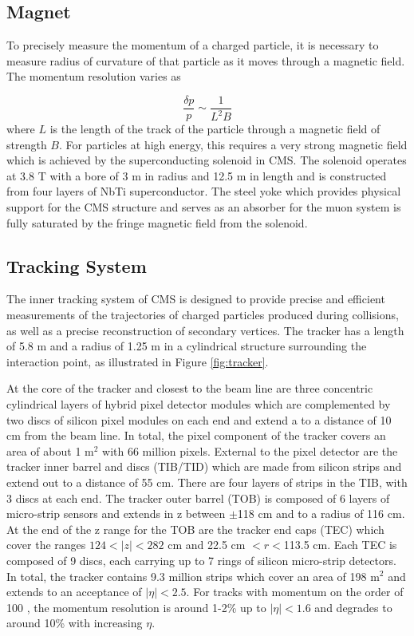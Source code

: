  \subsection{Magnet}
To precisely measure the momentum of a charged particle, 
 it is necessary to measure radius of curvature 
 of that particle as it moves through a magnetic field.
The momentum resolution varies as 

\begin{equation}\label{eq:res_mag}
\frac{\delta p}{p} \sim \frac{1}{L^2B}
\end{equation}
 where $L$ is the length of the track of the 
 particle through a magnetic field of
 strength $B$.
For particles at high energy, this requires a very strong
 magnetic field which is achieved by the superconducting 
 solenoid in CMS.
The solenoid operates at 3.8 T with 
 a bore of 3 m in radius and 12.5 m in length
 and is constructed from four layers of NbTi superconductor.
The steel yoke which provides physical support for the 
 CMS structure and serves as an absorber for the
 muon system is fully saturated by the fringe magnetic field
 from the solenoid.

 \subsection{Tracking System}
The inner tracking system of CMS is designed to provide
 precise and efficient measurements of the trajectories
 of charged particles produced during collisions,
 as well as a precise reconstruction of secondary vertices.
The tracker has a length of 5.8 m and a radius of
 1.25 m in a cylindrical structure surrounding the 
 interaction point, as illustrated in Figure \ref{fig:tracker}.

At the core of the tracker and closest to the beam line
 are three concentric cylindrical layers %
 of hybrid pixel detector modules which are complemented
 by two discs of silicon pixel modules on each end
 and extend a to a distance of 10 cm from the beam line.
In total, the pixel component of the tracker covers
 an area of about 1 m$^2$ with 66 million pixels.
External to the pixel detector are the tracker
 inner barrel and discs (TIB/TID)
 which are made from silicon strips and extend 
 out to a distance of 55 cm.
There are four layers of strips in the TIB, with 3 discs at each end.
The tracker outer barrel (TOB) is composed of
 6 layers of micro-strip sensors and extends
 in z between $\pm$118 cm and to a radius of 116 cm.
At the end of the z range for the TOB are the
 tracker end caps (TEC) which cover the ranges
 $124<|z|<282$ cm and 22.5 cm $<r<$113.5 cm.
Each TEC is composed of 9 discs,
 each carrying up to 7 rings of silicon micro-strip detectors.
In total, the tracker contains 9.3 million strips
 which cover an area of 198 m$^2$ and extends
 to an acceptance of $|\eta|<2.5$.
For tracks with momentum on the order of 100 \GeV,
 the momentum resolution is around 1-2\% up to $|\eta|<1.6$
 and degrades to around 10\% with increasing $\eta$.

